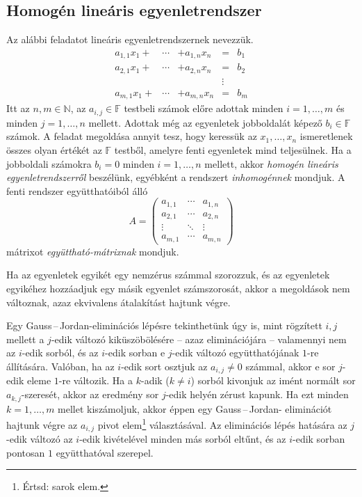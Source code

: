 \documentclass[9pt, a4paper, showtrims]{memoir}
\theoremstyle{plain}
\theoremstyle{remark}
\theoremstyle{definition}
\begin{document}
\subsection{Homogén lineáris egyenletrendszer}
Az alábbi feladatot lineáris egyenletrendszernek nevezzük.
\[
	\begin{array}{rrlcl}
		a_{1,1}x_1+ & \cdots & +a_{1,n}x_n & =      & b_1 \\
		a_{2,1}x_1+ & \cdots & +a_{2,n}x_n & =      & b_2 \\
		            &        &             & \vdots &     \\
		a_{m,1}x_1+ & \cdots & +a_{m,n}x_n & =      & b_m
	\end{array}
\]
Itt az $n,m\in\mathbb{N}$, az $a_{i,j}\in\mathbb{F}$ testbeli számok előre adottak
minden $i=1,\ldots,m$ és minden $j=1,\ldots,n$ mellett.
Adottak még az egyenletek jobboldalát képező $b_i\in\mathbb{F}$ számok.
A feladat megoldása annyit tesz, hogy keressük az $x_1,\ldots,x_n$ ismeretlenek
összes olyan értékét az $\mathbb{F}$ testből,
amelyre fenti egyenletek mind teljesülnek.
Ha a jobboldali számokra $b_i=0$ minden $i=1,\ldots,n$ mellett,
akkor
\emph{homogén lineáris egyenletrendszerről}%
beszélünk,
egyébként a rendszert
\emph{inhomogénnek}%
mondjuk.
A fenti rendszer együtthatóiból álló
\[
	A=
	\begin{pmatrix}
		a_{1,1} & \cdots & a_{1,n} \\
		a_{2,1} & \cdots & a_{2,n} \\
		\vdots  & \ddots & \vdots  \\
		a_{m,1} & \cdots & a_{m,n}
	\end{pmatrix}
\]
mátrixot
\emph{együttható-mátrixnak}%
mondjuk.

Ha az egyenletek egyikét egy nemzérus számmal szorozzuk,
és az egyenletek egyikéhez hozzáadjuk egy másik egyenlet számszorosát,
akkor a megoldások nem változnak,
azaz ekvivalens átalakítást hajtunk végre.

Egy Gauss\,--\,Jordan-eliminációs  lépésre tekinthetünk úgy is,
mint rögzített $i,j$ mellett a $j$-edik változó kiküszöbölésére
-- azaz eliminációjára --
valamennyi nem az $i$-edik sorból,
és az $i$-edik sorban e $j$-edik változó együtthatójának $1$-re állítására.
Valóban,
ha az $i$-edik sort osztjuk az $a_{i,j}\neq 0$ számmal, akkor e sor $j$-edik
eleme $1$-re változik.
Ha a $k$-adik ($k\neq i$) sorból kivonjuk az imént normált sor
$a_{k,j}$-szeresét, akkor az eredmény sor $j$-edik helyén zérust kapunk.
Ha ezt minden $k=1,\ldots,m$ mellet kiszámoljuk, akkor éppen egy Gauss\,--\,Jordan-%
eliminációt hajtunk végre az $a_{i,j}$ pivot elem\footnote{Értsd: sarok elem.} választásával.
Az eliminációs lépés hatására az $j$-edik változó az $i$-edik kivételével
minden más sorból eltűnt, és az $i$-edik sorban pontosan $1$ együtthatóval szerepel.
\end{document}
